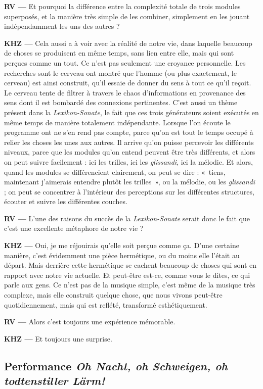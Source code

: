 \documentclass[a4paper,12pt]{article}
\newcommand{\guill}[1]{«~#1~»}
\begin{document}
\textbf{RV ---} Et pourquoi la différence entre la complexité totale de trois modules superposés, et la manière très simple de les combiner, simplement en les jouant indépendamment les uns des autres ?

\textbf{KHZ ---} Cela aussi a à voir avec la réalité de notre vie, dans laquelle beaucoup de choses se produisent en même temps, sans lien entre elle, mais qui sont perçues comme un tout. Ce n'est pas seulement une croyance personnelle. Les recherches sont le cerveau ont montré que l'homme (ou plus exactement, le cerveau) est ainsi construit, qu'il essaie de donner du sens à tout ce qu'il reçoit. Le cerveau tente de filtrer à travers le chaos d'informations en provenance des sens dont il est bombardé des connexions pertinentes. C'est aussi un thème présent dans la \emph{Lexikon-Sonate}, le fait que ces trois générateurs soient exécutés en même temps de manière totalement indépendante. Lorsque l'on écoute le programme ont ne s'en rend pas compte, parce qu'on est tout le temps occupé à relier les choses les unes aux autres. Il arrive qu'on puisse percevoir les différents niveaux, parce que les modules qu'on entend peuvent être très différents, et alors on peut suivre facilement : ici les trilles, ici les \emph{glissandi}, ici la mélodie. Et alors, quand les modules se différencient clairement, on peut se dire : \guill{tiens, maintenant j'aimerais entendre plutôt les trilles}, ou la mélodie, ou les \emph{glissandi} ; on peut se concentrer à l'intérieur des perceptions sur les différentes structures, écouter et suivre les différentes couches.

\textbf{RV ---} L'une des raisons du succès de la \emph{Lexikon-Sonate} serait donc le fait que c'est une excellente métaphore de notre vie ?

\textbf{KHZ ---} Oui, je me réjouirais qu'elle soit perçue comme ça. D'une certaine manière, c'est évidemment une pièce hermétique, ou du moins elle l'était au départ. Mais derrière cette hermétique se cachent beaucoup de choses qui sont en rapport avec notre vie actuelle. Et peut-être est-ce, comme vous le dites, ce qui parle aux gens. Ce n'est pas de la musique simple, c'est même de la musique très complexe, mais elle construit quelque chose, que nous vivons peut-être quotidiennement, mais qui est reflété, transformé esthétiquement.

\textbf{RV ---} Alors c'est toujours une expérience mémorable.

\textbf{KHZ ---} Et toujours une surprise.


\subsection{Performance \emph{Oh Nacht, oh Schweigen, oh todtenstiller Lärm!}}
\end{document}
